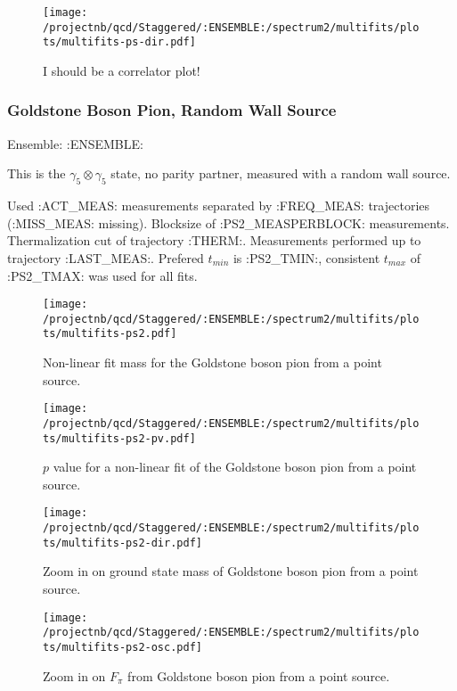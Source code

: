 \begin{figure}[H]
\centering
\texttt{[image: /projectnb/qcd/Staggered/:ENSEMBLE:/spectrum2/multifits/plots/multifits-ps-dir.pdf]}
\caption{I should be a correlator plot!}
\end{figure}

\clearpage

\subsubsection{Goldstone Boson Pion, Random Wall Source}

Ensemble: :ENSEMBLE:

This is the $\gamma_5 \otimes \gamma_5$ state, no parity partner, measured with a random wall source.

{\small{Used :ACT_MEAS: measurements separated by :FREQ_MEAS: trajectories (:MISS_MEAS: missing). Blocksize of :PS2_MEASPERBLOCK: measurements. Thermalization cut of trajectory :THERM:. Measurements performed up to trajectory :LAST_MEAS:. Prefered $t_{min}$ is :PS2_TMIN:, consistent $t_{max}$ of :PS2_TMAX: was used for all fits.}}

\begin{multicols}{2}
\begin{figure}[H]
\centering
\texttt{[image: /projectnb/qcd/Staggered/:ENSEMBLE:/spectrum2/multifits/plots/multifits-ps2.pdf]}
\caption{Non-linear fit mass for the Goldstone boson pion from a point source.}
\end{figure}
\columnbreak
\begin{figure}[H]
\centering
\texttt{[image: /projectnb/qcd/Staggered/:ENSEMBLE:/spectrum2/multifits/plots/multifits-ps2-pv.pdf]}
\caption{$p$ value for a non-linear fit of the Goldstone boson pion from a point source.}
\end{figure}
\end{multicols}

\begin{multicols}{2}
\begin{figure}[H]
\centering
\texttt{[image: /projectnb/qcd/Staggered/:ENSEMBLE:/spectrum2/multifits/plots/multifits-ps2-dir.pdf]}
\caption{Zoom in on ground state mass of Goldstone boson pion from a point source.}
\end{figure}
\columnbreak
\begin{figure}[H]
\centering
\texttt{[image: /projectnb/qcd/Staggered/:ENSEMBLE:/spectrum2/multifits/plots/multifits-ps2-osc.pdf]}
\caption{Zoom in on $F_\pi$ from Goldstone boson pion from a point source.}
\end{figure}
\end{multicols}

